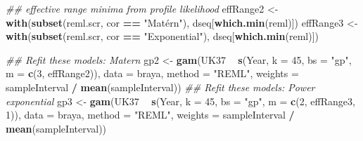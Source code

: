 \documentclass[12pt,]{article}
\newenvironment{Shaded}{\begin{snugshade}}{\end{snugshade}}
\newcommand{\CommentTok}[1]{\textcolor[rgb]{0.56,0.35,0.01}{\textit{#1}}}
\newcommand{\DataTypeTok}[1]{\textcolor[rgb]{0.13,0.29,0.53}{#1}}
\newcommand{\DecValTok}[1]{\textcolor[rgb]{0.00,0.00,0.81}{#1}}
\newcommand{\KeywordTok}[1]{\textcolor[rgb]{0.13,0.29,0.53}{\textbf{#1}}}
\newcommand{\NormalTok}[1]{#1}
\newcommand{\OperatorTok}[1]{\textcolor[rgb]{0.81,0.36,0.00}{\textbf{#1}}}
\newcommand{\StringTok}[1]{\textcolor[rgb]{0.31,0.60,0.02}{#1}}
\begin{document}
\begin{Shaded}
\begin{Highlighting}[]
\CommentTok{## effective range minima from profile likelihood}
\NormalTok{effRange2 <-}\StringTok{ }\KeywordTok{with}\NormalTok{(}\KeywordTok{subset}\NormalTok{(reml.scr, cor }\OperatorTok{==}\StringTok{ "Matérn"}\NormalTok{), dseq[}\KeywordTok{which.min}\NormalTok{(reml)])}
\NormalTok{effRange3 <-}\StringTok{ }\KeywordTok{with}\NormalTok{(}\KeywordTok{subset}\NormalTok{(reml.scr, cor }\OperatorTok{==}\StringTok{ "Exponential"}\NormalTok{), dseq[}\KeywordTok{which.min}\NormalTok{(reml)])}

\CommentTok{## Refit these models: Matern}
\NormalTok{gp2 <-}\StringTok{ }\KeywordTok{gam}\NormalTok{(UK37 }\OperatorTok{~}\StringTok{ }\KeywordTok{s}\NormalTok{(Year, }\DataTypeTok{k =} \DecValTok{45}\NormalTok{, }\DataTypeTok{bs =} \StringTok{"gp"}\NormalTok{, }\DataTypeTok{m =} \KeywordTok{c}\NormalTok{(}\DecValTok{3}\NormalTok{, effRange2)),}
           \DataTypeTok{data =}\NormalTok{ braya,}
           \DataTypeTok{method =} \StringTok{"REML"}\NormalTok{, }\DataTypeTok{weights =}\NormalTok{ sampleInterval }\OperatorTok{/}\StringTok{ }\KeywordTok{mean}\NormalTok{(sampleInterval))}
\CommentTok{## Refit these models: Power exponential}
\NormalTok{gp3 <-}\StringTok{ }\KeywordTok{gam}\NormalTok{(UK37 }\OperatorTok{~}\StringTok{ }\KeywordTok{s}\NormalTok{(Year, }\DataTypeTok{k =} \DecValTok{45}\NormalTok{, }\DataTypeTok{bs =} \StringTok{"gp"}\NormalTok{, }\DataTypeTok{m =} \KeywordTok{c}\NormalTok{(}\DecValTok{2}\NormalTok{, effRange3, }\DecValTok{1}\NormalTok{)),}
           \DataTypeTok{data =}\NormalTok{ braya,}
           \DataTypeTok{method =} \StringTok{"REML"}\NormalTok{, }\DataTypeTok{weights =}\NormalTok{ sampleInterval }\OperatorTok{/}\StringTok{ }\KeywordTok{mean}\NormalTok{(sampleInterval))}


\end{Highlighting}
\end{Shaded}
\end{document}
